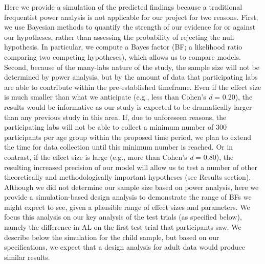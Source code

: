 \documentclass[
  man,floatsintext]{apa6}
\begin{document}
Here we provide a simulation of the predicted findings because a traditional frequentist power analysis is not applicable for our project for two reasons. First, we use Bayesian methods to quantify the strength of our evidence for or against our hypotheses, rather than assessing the probability of rejecting the null hypothesis. In particular, we compute a Bayes factor (BF; a likelihood ratio comparing two competing hypotheses), which allows us to compare models. Second, because of the many-labs nature of the study, the sample size will not be determined by power analysis, but by the amount of data that participating labs are able to contribute within the pre-established timeframe. Even if the effect size is much smaller than what we anticipate (e.g., less than Cohen's \emph{d} = 0.20), the results would be informative as our study is expected to be dramatically larger than any previous study in this area. If, due to unforeseen reasons, the participating labs will not be able to collect a minimum number of 300 participants per age group within the proposed time period, we plan to extend the time for data collection until this minimum number is reached. Or in contrast, if the effect size is large (e.g., more than Cohen's \emph{d} = 0.80), the resulting increased precision of our model will allow us to test a number of other theoretically and methodologically important hypotheses (see Results section).
Although we did not determine our sample size based on power analysis, here we provide a simulation-based design analysis to demonstrate the range of BFs we might expect to see, given a plausible range of effect sizes and parameters. We focus this analysis on our key analysis of the test trials (as specified below), namely the difference in AL on the first test trial that participants saw. We describe below the simulation for the child sample, but based on our specifications, we expect that a design analysis for adult data would produce similar results.
\end{document}
